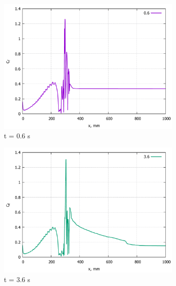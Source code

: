 	\begin{figure}[H]
		\begin{subfigure}{.5\textwidth}
			\centering
			\includegraphics[width=1\linewidth]{../Assets/Cf-T06-31p}
			\caption{t = 0.6 s}
			\label{fig:Cf-T06-31p}
		\end{subfigure}%
		\begin{subfigure}{.5\textwidth}
			\centering
			\includegraphics[width=1\linewidth]{../Assets/Cf-T360-31p}
			\caption{t = 3.6 s}
			\label{fig:Cf-T360-31p}
		\end{subfigure}
		\\
		\begin{subfigure}{.5\textwidth}
			\centering

\end{subfigure}
\end{figure}
